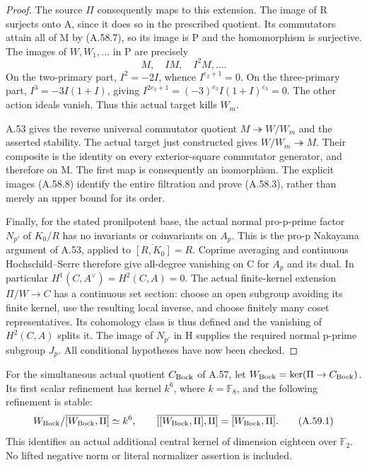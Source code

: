 \begin{proof}
The source \(\Pi\) consequently maps to this extension. The
image of R surjects onto A, since it does so in the prescribed
quotient. Its commutators attain all of M by (A.58.7), so its
image is P and the homomorphism is surjective. The images of
\(W,W_1,\ldots\) in P are precisely
\[
 M,\quad IM,\quad I^2M,\ldots.
 \tag{A.58.8}
\]
On the two-primary part, \(I^2=-2I\), whence
\(I^{e_2+1}=0\). On the three-primary part,
\(I^3=-3I(1+I)\), giving
\(I^{2e_3+1}=(-3)^{e_3}I(1+I)^{e_3}=0\).
The other action ideals vanish. Thus this actual target kills
\(W_m\).

A.53 gives the reverse universal commutator quotient
\(M\twoheadrightarrow W/W_m\) and the asserted stability.
The actual target just constructed gives
\(W/W_m\twoheadrightarrow M\). Their composite is the
identity on every exterior-square commutator generator, and
therefore on M. The first map is consequently an isomorphism.
The explicit images (A.58.8) identify the entire filtration and
prove (A.58.3), rather than merely an upper bound for its order.

Finally, for the stated pronilpotent base, the actual normal
pro-p-prime factor \(N_{p'}\) of \(K_0/R\) has no invariants
or coinvariants on \(A_p\). This is the pro-p Nakayama argument
of A.53, applied to \(\overline{[R,K_0]}=R\).
Coprime averaging and continuous Hochschild--Serre therefore
give all-degree vanishing on C for \(A_p\) and its dual.
In particular \(H^1(C,A^\vee)=H^2(C,A)=0\). The actual
finite-kernel extension \(\Pi/W\to C\) has a continuous set
section: choose an open subgroup avoiding its finite kernel,
use the resulting local inverse, and choose finitely many
coset representatives. Its cohomology class is thus defined
and the vanishing of \(H^2(C,A)\) splits it. The image of
\(N_{p'}\) in H supplies the required normal p-prime subgroup
\(J_p\). All conditional hypotheses have now been checked.
\end{proof}


For the simultaneous actual quotient \(C_{\rm Bock}\) of A.57,
let \(W_{\rm Bock}=\ker(\Pi\to C_{\rm Bock})\). Its first
scalar refinement has kernel \(k^6\), where \(k=\mathbb F_8\),
and the following refinement is stable:
\[
 W_{\rm Bock}/\overline{[W_{\rm Bock},\Pi]}\simeq k^6,
 \qquad
 \overline{[[W_{\rm Bock},\Pi],\Pi]}
   =\overline{[W_{\rm Bock},\Pi]}.
 \tag{A.59.1}
\]
This identifies an actual additional central kernel of dimension
eighteen over \(\mathbb F_2\). No lifted negative norm or literal
normalizer assertion is included.


